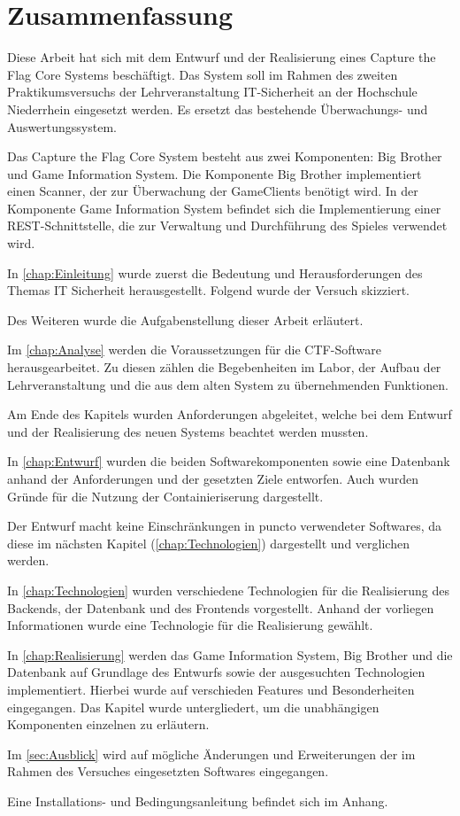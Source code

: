 \section{Zusammenfassung}
Diese Arbeit hat sich mit dem Entwurf und der Realisierung eines Capture the Flag Core Systems beschäftigt. Das System soll im Rahmen des zweiten Praktikumsversuchs der Lehrveranstaltung IT-Sicherheit an der Hochschule Niederrhein eingesetzt werden. Es ersetzt das bestehende Überwachungs- und Auswertungssystem.

Das Capture the Flag Core System besteht aus zwei Komponenten: Big Brother und Game Information System. Die Komponente Big Brother implementiert einen Scanner, der zur Überwachung der GameClients benötigt wird. In der Komponente Game Information System befindet sich die Implementierung einer REST-Schnittstelle, die zur Verwaltung und Durchführung des Spieles verwendet wird.

In \autoref{chap:Einleitung} wurde zuerst die Bedeutung und Herausforderungen des Themas IT Sicherheit herausgestellt. Folgend wurde der Versuch  skizziert.

Des Weiteren wurde die Aufgabenstellung dieser Arbeit erläutert.

Im \autoref{chap:Analyse} werden die Voraussetzungen für die CTF-Software herausgearbeitet. Zu diesen zählen die Begebenheiten im Labor, der Aufbau der Lehrveranstaltung und die aus dem alten System zu übernehmenden Funktionen.

Am Ende des Kapitels wurden Anforderungen abgeleitet, welche bei dem Entwurf und der Realisierung des neuen Systems beachtet werden mussten.

In \autoref{chap:Entwurf} wurden die beiden Softwarekomponenten sowie eine Datenbank anhand der Anforderungen und der gesetzten Ziele entworfen. Auch wurden Gründe für die Nutzung der Containieriserung dargestellt. 

Der Entwurf macht keine Einschränkungen in puncto verwendeter Softwares, da diese im nächsten Kapitel (\ref{chap:Technologien}) dargestellt und verglichen werden.

In \autoref{chap:Technologien} wurden verschiedene Technologien für die Realisierung des Backends, der Datenbank und des Frontends vorgestellt. Anhand der vorliegen Informationen wurde eine Technologie für die Realisierung gewählt.

In \autoref{chap:Realisierung} werden das Game Information System, Big Brother und die Datenbank auf Grundlage des Entwurfs sowie der ausgesuchten Technologien implementiert. Hierbei wurde auf verschieden Features und Besonderheiten eingegangen. Das Kapitel wurde untergliedert, um die unabhängigen Komponenten einzelnen zu erläutern.

Im \autoref{sec:Ausblick} wird auf mögliche Änderungen und Erweiterungen der im Rahmen des Versuches eingesetzten Softwares eingegangen.

Eine Installations- und Bedingungsanleitung befindet sich im Anhang.